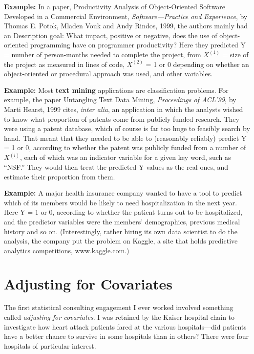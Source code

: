 {\bf Example:}  In a paper, Productivity Analysis of Object-Oriented
Software Developed in a Commercial Environment, {\it Software---Practice
and Experience}, by Thomas E. Potok, Mladen Vouk and Andy Rindos, 1999,
the authors mainly had an Description goal:  What impact, positive or
negative, does the use of object-oriented programming have on programmer
productivity?  Here they predicted Y = number of person-months needed to
complete the project, from  $X^{(1)}$ = size of the project as measured
in lines of code,  $X^{(2)}$ = 1 or 0 depending on whether an
object-oriented or procedural approach was used, and other variables.

{\bf Example:}  Most {\bf text mining} applications are classification
problems.  For example, the paper Untangling Text Data Mining, {\it
Proceedings of ACL'99}, by Marti Hearst, 1999 cites, {\it inter alia},
an application in which the analysts wished to know what proportion of
patents come from publicly funded research.  They were using a patent
database, which of course is far too huge to feasibly search by hand.
That meant that they needed to be able to (reasonably reliably) predict
Y = 1 or 0, according to whether the patent was publicly funded from a
number of $X^{(i)}$, each of which was an indicator variable for a given
key word, such as ``NSF.''  They would then treat the predicted Y values
as the real ones, and estimate their proportion from them.

{\bf Example:} A major health insurance company wanted to have a tool to
predict which of its members would be likely to need hospitalization in
the next year.  Here Y = 1 or 0, according to whether the patient turns
out to be hospitalized, and the predictor variables were the members'
demographics, previous medical history and so on.  (Interestingly,
rather hiring its own data scientist to do the analysis, the company put
the problem on Kaggle, a site that holds predictive analytics
competitions, \url{www.kaggle.com}.)

\section{Adjusting for Covariates}

The first statistical consulting engagement I ever worked involved
something called {\it adjusting for covariates}.  I was retained by the
Kaiser hospital chain to investigate how heart attack patients fared at
the various hospitals---did patients have a better chance to survive in
some hospitals than in others?  There were four hospitals of particular
interest.


